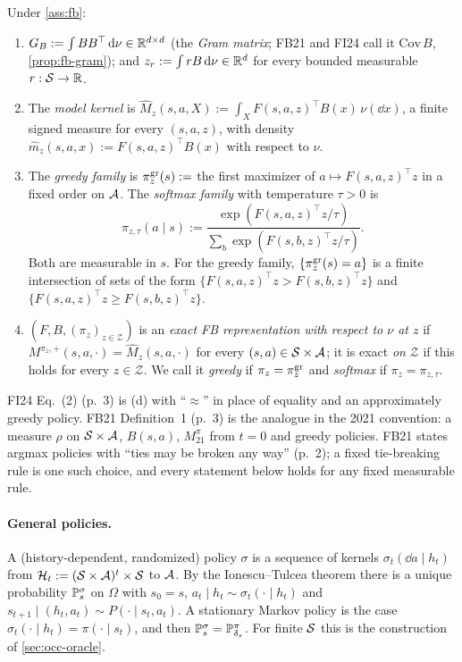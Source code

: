 \begin{definition}[FB objects]\label{def:fb}
Under \cref{ass:fb}:
\begin{enumerate}[nosep,label=(\alph*)]
\item $G_B:=\int BB^\top\,\mathrm{d}\nu\in\mathbb{R}^{d\times d}$ (the \emph{Gram matrix}; FB21 and FI24 call it $\mathrm{Cov}\,B$, \cref{prop:fb-gram}); and $z_r:=\int rB\,\mathrm{d}\nu\in\mathbb{R}^d$ for every bounded measurable $r:\mathcal{S}\to\mathbb{R}$.
\item The \emph{model kernel} is $\hat M_z(s,a,X):=\int_XF(s,a,z)^\top B(x)\,\nu(\dd x)$, a finite signed measure for every $(s,a,z)$, with density $\hat m_z(s,a,x):=F(s,a,z)^\top B(x)$ with respect to $\nu$.
\item The \emph{greedy family} is $\pi^{\mathrm{gr}}_z(s):=$ the first maximizer of $a\mapsto F(s,a,z)^\top z$ in a fixed order on $\mathcal{A}$.
  The \emph{softmax family} with temperature $\tau>0$ is
  \begin{equation}\label{eq:fb-softmax}
  \pi_{z,\tau}(a\mid s):=\frac{\exp(F(s,a,z)^\top z/\tau)}{\sum_b\exp(F(s,b,z)^\top z/\tau)}.
  \end{equation}
  Both are measurable in $s$. For the greedy family, $\{\pi^{\mathrm{gr}}_z(s)=a\}$ is a finite intersection of sets of the form $\{F(s,a,z)^\top z>F(s,b,z)^\top z\}$ and $\{F(s,a,z)^\top z\ge F(s,b,z)^\top z\}$.
\item $(F,B,(\pi_z)_{z\in\mathcal Z})$ is an \emph{exact FB representation with respect to $\nu$ at $z$} if
  $M^{\pi_z,+}(s,a,\cdot)=\hat M_z(s,a,\cdot)$ for every $(s,a)\in\mathcal{S}\times\mathcal{A}$; it is exact \emph{on} $\mathcal Z$ if this holds for every $z\in\mathcal Z$.
  We call it \emph{greedy} if $\pi_z=\pi^{\mathrm{gr}}_z$ and \emph{softmax} if $\pi_z=\pi_{z,\tau}$.
\end{enumerate}
\end{definition}
FI24 Eq.~(2) (p.~3) is (d) with ``$\approx$'' in place of equality and an approximately greedy policy.
FB21 Definition~1 (p.~3) is the analogue in the 2021 convention: a measure $\rho$ on $\mathcal{S}\times\mathcal{A}$, $B(s,a)$, $M^\pi_{21}$ from $t=0$ and greedy policies.
FB21 states argmax policies with ``ties may be broken any way'' (p.~2); a fixed tie-breaking rule is one such choice, and every statement below holds for any fixed measurable rule.

\paragraph{General policies.}
A (history-dependent, randomized) policy $\sigma$ is a sequence of kernels $\sigma_t(\dd a\mid h_t)$ from $\mathcal H_t:=(\mathcal{S}\times\mathcal{A})^t\times\mathcal{S}$ to $\mathcal{A}$.
By the Ionescu--Tulcea theorem there is a unique probability $\mathbb{P}^\sigma_s$ on $\Omega$ with $s_0=s$, $a_t\mid h_t\sim\sigma_t(\cdot\mid h_t)$ and $s_{t+1}\mid(h_t,a_t)\sim P(\cdot\mid s_t,a_t)$.
A stationary Markov policy is the case $\sigma_t(\cdot\mid h_t)=\pi(\cdot\mid s_t)$, and then $\mathbb{P}^\sigma_s=\mathbb{P}^\pi_{\delta_s}$.
For finite $\mathcal{S}$ this is the construction of \cref{sec:occ-oracle}.

